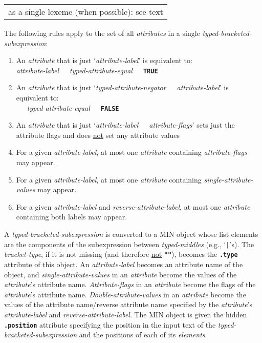 \documentclass[12pt]{article}
\newcommand{\TT}[1]{{\tt \bfseries #1}}
\newenvironment{indpar}[1][0.3in]%
	{\begin{list}{}%
		     {\setlength{\itemsep}{0in}%
		      \setlength{\topsep}{0in}%
		      \setlength{\parsep}{1ex}%
		      \setlength{\labelwidth}{#1}%
		      \setlength{\leftmargin}{#1}%
		      \addtolength{\leftmargin}{\labelsep}}%
	 \item}%
	{\end{list}}
\begin{document}
\begin{indpar}[0.1in]
\begin{indpar}[0.2in]
\begin{tabular}[t]{@{}l}
    as a single lexeme (when possible): see text
    \end{tabular}
\end{indpar}
The following rules apply to the set of all {\em attributes} in a
single {\em typed-bracketed-subexpression}:
\begin{enumerate}
\item
An {\em attribute} that is just `{\em attribute-label}' is equivalent to: \\
\hspace*{1in} {\em attribute-label}~~~{\em typed-attribute-equal}~~~\TT{TRUE}
\item
An {\em attribute} that is just
`{\em typed-attribute-negator}~~~{\em attribute-label}' is equivalent to: \\
\hspace*{1in}{\em attribute-label}~~~{\em typed-attribute-equal}~~~\TT{FALSE}
\item
An {\em attribute} that is just
`{\em attribute-label}~~~{\em attribute-flags}' sets just the attribute
flags and does \underline{not} set any attribute values
\item
For a given {\em attribute-label}, at most one {\em attribute} containing
{\em attribute-flags} may appear.
\item
For a given {\em attribute-label}, at most one {\em attribute} containing
{\em single-attribute-values} may appear.
\item
For a given {\em attribute-label} and {\em reverse-attribute-label},
at most one {\em attribute} containing both labels may appear.
\end{enumerate}
\end{indpar}

A {\em typed-bracketed-subexpression} is converted to a
MIN object whose list elements are the components of the
subexpression between {\em typed-middles} (e.g., `\TT{|}'s).  The
{\em bracket-type}, if it is not missing
(and therefore \underline{not} \TT{""}), becomes the \TT{.type}
attribute of this object.  An {\em attribute-label}
becomes an attribute name of the object, and
{\em single-attribute-values} in an {\em attribute}
become the values of the {\em attribute}'s attribute name.
{\em Attribute-flags} in an {\em attribute}
become the flags of the {\em attribute}'s attribute name.
{\em Double-attribute-values} in an {\em attribute}
become the values of the attribute name/reverse attribute name
specified by the {\em attribute}'s {\em attribute-label} and
{\em reverse-attribute-label}.  The MIN object is given the
hidden \TT{.position} attribute specifying the position in the
input text of the {\em typed-bracketed-subexpression} and the
positions of each of its {\em elements}.
\end{document}
